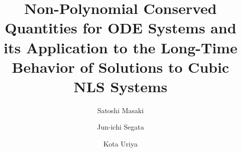 \documentclass[11pt,a4paper,twosides]{amsart}
\theoremstyle{plain}
\theoremstyle{remark}
\numberwithin{equation}{section}
\theoremstyle{definition}
\newcommand{\1}{{\bf 1}_{\{|x| < |t|\}}}
\begin{document}
\title[]
{Non-Polynomial Conserved Quantities for ODE Systems and its Application to the Long-Time Behavior of Solutions to Cubic NLS Systems}

\author{Satoshi Masaki}
\address{Department of Mathematics, 
Faculty of Science, Hokkaido University,
Kita 10, Nishi 8, Kita-Ku, Sapporo, Hokkaido, 060-0810, Japan}

\author{Jun-ichi Segata}
\address{Faculty of Mathematics, Kyushu University, 
Fukuoka, 819-0395, Japan}

\author{Kota Uriya}
\address{Department of Applied Mathematics, Faculty of Science, 
Okayama University of Science, Okayama, 700-0005, Japan}



\maketitle
\end{document}

